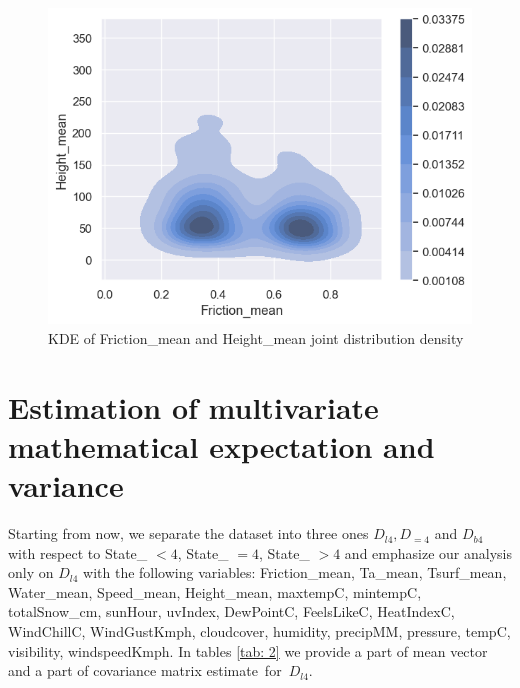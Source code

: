 \documentclass[12pt, bachelor, substylefile = algo_title.rtx]{disser}
\theoremstyle{definition}
\begin{document}
\begin{figure}[!h]
\centering
   \begin{minipage}{0.7\textwidth}
     \includegraphics[width=\linewidth]{frihei}
   \end{minipage}
\caption{KDE of Friction\_mean and Height\_mean joint distribution density}
\label{fig: 16}
\end{figure}

\section{Estimation of multivariate mathematical expectation and variance}
\label{sec: est}
Starting from now, we separate the dataset into three ones $D_{l4}, D_{=4}$ and $D_{b4}$ with respect to State\_ $<4$, State\_ $=4$, State\_ $>4$ and emphasize our analysis only on  $D_{l4}$ with the following variables: Friction\_mean, Ta\_mean, Tsurf\_mean,
       Water\_mean, Speed\_mean, Height\_mean, maxtempC, mintempC, totalSnow\_cm,
       sunHour, uvIndex, DewPointC, FeelsLikeC, HeatIndexC,
      WindChillC, WindGustKmph, cloudcover, humidity, precipMM,
       pressure, tempC, visibility, windspeedKmph. In tables \ref{tab: 2} we provide a part of mean vector and a part of covariance matrix estimate~for~$D_{l4}$.
\end{document}

